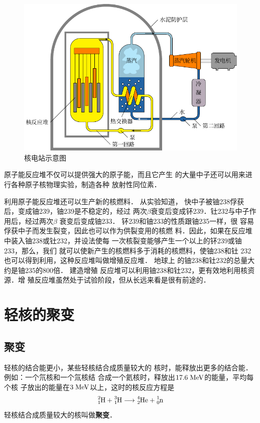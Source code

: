 \begin{figure}[htbp]
    \centering
    \includegraphics{fig/C/9-15.pdf}
    \caption{核电站示意图}\label{fig_C_9-15}
\end{figure}

原子能反应堆不仅可以提供强大的原子能，而且它产生
的大量中子还可以用来进行各种原子核物理实验，制造各种
放射性同位素．

利用原子能反应堆还可以生产新的核燃料．
从实验知道，
快中子被铀238俘获后，变成铀239，铀239是不稳定的，经过
两次$\beta$衰变后变成钚239．钍232与中子作用后，经过两次$\beta$
衰变后变成铀233．
钚239和铀233的性质跟铀235一样，很
容易俘获中子而发生裂变，因此也可以作为供裂变用的核燃
料．因此，如果在反应堆中装入铀238或钍232，并设法使每
一次核裂变能够产生一个以上的钚239或铀233，那么，我们
就可以使新产生的核燃料多于消耗的核燃料，使铀238和钍
232也可以得到利用，这种反应堆叫做增殖反应堆．
地球上
的铀238和钍232的总量大约是铀235的800倍．
建造增殖
反应堆可以利用铀238和钍232，更有效地利用核资源．增
殖反应堆虽然处于试验阶段，但从长远来看是很有前途的．

\section{轻核的聚变}
\subsection{聚变}
轻核的结合能更小，某些轻核结合成质量较大的
核时，能释放出更多的结合能．例如：一个氘核和一个氚核结
合成一个氦核时，释放出$17.6 \;\text{MeV}$的能量，平均每个核
子放出的能量在$3 \;\text{MeV}$以上，这时的核反应方程是
\[\atom{H}{2}{1}+\atom{H}{3}{1}\longrightarrow \atom{He}{4}{2}+\atom{n}{1}{0} 
    \]
轻核结合成质量较大的核叫做\textbf{聚变}．

